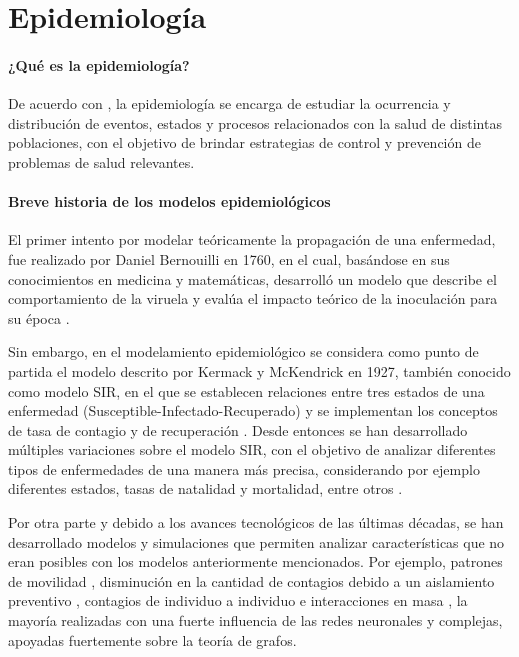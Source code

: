 \chapter{Epidemiología}
\subsubsection{¿Qué es la epidemiología?}
De acuerdo con \cite{epiDictionary}, la epidemiología se encarga de estudiar la ocurrencia y distribución de eventos, estados y procesos relacionados con la salud de distintas poblaciones, con el objetivo de brindar estrategias de control y prevención de problemas de salud relevantes.

\subsubsection{Breve historia de los modelos epidemiológicos} 

El primer intento por modelar teóricamente la propagación de una enfermedad, fue realizado por Daniel Bernouilli en 1760, en el cual, basándose en sus conocimientos en medicina y matemáticas, desarrolló un modelo que describe el comportamiento de la viruela y evalúa el impacto teórico de la inoculación para su época \cite{shortHistory}. 

Sin embargo, en el modelamiento epidemiológico se considera como punto de partida el modelo descrito por Kermack y McKendrick en 1927, también conocido como modelo SIR, en el que se establecen relaciones entre tres estados de una enfermedad (Susceptible-Infectado-Recuperado) y se implementan los conceptos de tasa de contagio y de recuperación \cite{malariaSIR}. Desde entonces se han desarrollado múltiples variaciones sobre el modelo SIR, con el objetivo de analizar diferentes tipos de enfermedades de una manera más precisa, considerando por ejemplo diferentes estados, tasas de natalidad y mortalidad, entre otros \cite{diego2010}.

Por otra parte y debido a los avances tecnológicos de las últimas décadas, se han desarrollado modelos y simulaciones que permiten analizar características que no eran posibles con los modelos anteriormente mencionados. Por ejemplo, patrones de movilidad \cite{colaGNN, epidemiologicalNeuralNetwork}, disminución en la cantidad de contagios debido a un aislamiento preventivo \cite{stayHome}, contagios de individuo a individuo \cite{heterogeneousPopulation} e interacciones en masa \cite{combiningGraph, transfer2021}, la mayoría realizadas con una fuerte influencia de las redes neuronales y complejas, apoyadas fuertemente sobre la teoría de grafos.

